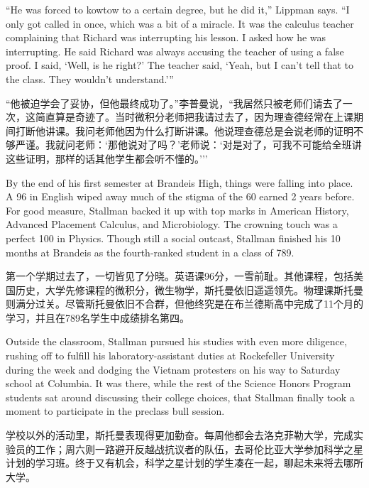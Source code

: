 \ifdefined\eng
``He was forced to kowtow to a certain degree, but he did it,'' Lippman says. ``I only got called in once, which was a bit of a miracle. It was the calculus teacher complaining that Richard was interrupting his lesson. I asked how he was interrupting. He said Richard was always accusing the teacher of using a false proof. I said, `Well, is he right?' The teacher said, `Yeah, but I can't tell that to the class. They wouldn't understand.'\hspace{0.01in}''
\fi

\ifdefined\chs
``他被迫学会了妥协，但他最终成功了。''李普曼说，``我居然只被老师们请去了一次，这简直算是奇迹了。当时微积分老师把我请过去了，因为理查德经常在上课期间打断他讲课。我问老师他因为什么打断讲课。他说理查德总是会说老师的证明不够严谨。我就问老师：`那他说对了吗？'老师说：`对是对了，可我不可能给全班讲这些证明，那样的话其他学生都会听不懂的。'\hspace{0.01in}''
\fi

\ifdefined\eng
By the end of his first semester at Brandeis High, things were falling into place. A 96 in English wiped away much of the stigma of the 60 earned 2 years before. For good measure, Stallman backed it up with top marks in American History, Advanced Placement Calculus, and Microbiology. The crowning touch was a perfect 100 in Physics. Though still a social outcast, Stallman finished his 10 months at Brandeis as the fourth-ranked student in a class of 789.
\fi

\ifdefined\chs
第一个学期过去了，一切皆见了分晓。英语课96分，一雪前耻。其他课程，包括美国历史，大学先修课程的微积分，微生物学，斯托曼依旧遥遥领先。物理课斯托曼则满分过关。尽管斯托曼依旧不合群，但他终究是在布兰德斯高中完成了11个月的学习，并且在789名学生中成绩排名第四。
\fi

\ifdefined\eng
Outside the classroom, Stallman pursued his studies with even more diligence, rushing off to fulfill his laboratory-assistant duties at Rockefeller University during the week and dodging the Vietnam protesters on his way to Saturday school at Columbia. It was there, while the rest of the Science Honors Program students sat around discussing their college choices, that Stallman finally took a moment to participate in the preclass bull session.
\fi

\ifdefined\chs
学校以外的活动里，斯托曼表现得更加勤奋。每周他都会去洛克菲勒大学，完成实验员的工作；周六则一路避开反越战抗议者的队伍，去哥伦比亚大学参加科学之星计划的学习班。终于又有机会，科学之星计划的学生凑在一起，聊起未来将去哪所大学。
\fi

